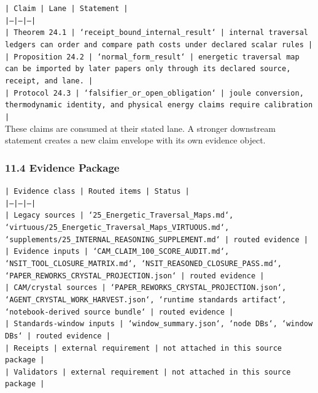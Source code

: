 \documentclass[11pt]{article}
\begin{document}
\noindent\texttt{| Claim | Lane | Statement |}\\
\noindent\texttt{|---|---|---|}\\
\noindent\texttt{| Theorem 24.1 | `receipt\_bound\_internal\_result` | internal traversal ledgers can order and compare path costs under declared scalar rules |}\\
\noindent\texttt{| Proposition 24.2 | `normal\_form\_result` | energetic traversal map can be imported by later papers only through its declared source, receipt, and lane. |}\\
\noindent\texttt{| Protocol 24.3 | `falsifier\_or\_open\_obligation` | joule conversion, thermodynamic identity, and physical energy claims require calibration |}\\

These claims are consumed at their stated lane. A stronger downstream statement
creates a new claim envelope with its own evidence object.

\subsubsection*{11.4 Evidence Package}

\noindent\texttt{| Evidence class | Routed items | Status |}\\
\noindent\texttt{|---|---|---|}\\
\noindent\texttt{| Legacy sources | `25\_Energetic\_Traversal\_Maps.md`, `virtuous/25\_Energetic\_Traversal\_Maps\_VIRTUOUS.md`, `supplements/25\_INTERNAL\_REASONING\_SUPPLEMENT.md` | routed evidence |}\\
\noindent\texttt{| Evidence inputs | `CAM\_CLAIM\_100\_SCORE\_AUDIT.md`, `NSIT\_TOOL\_CLOSURE\_MATRIX.md`, `NSIT\_REASONED\_CLOSURE\_PASS.md`, `PAPER\_REWORKS\_CRYSTAL\_PROJECTION.json` | routed evidence |}\\
\noindent\texttt{| CAM/crystal sources | `PAPER\_REWORKS\_CRYSTAL\_PROJECTION.json`, `AGENT\_CRYSTAL\_WORK\_HARVEST.json`, `runtime standards artifact`, `notebook-derived source bundle` | routed evidence |}\\
\noindent\texttt{| Standards-window inputs | `window\_summary.json`, `node DBs`, `window DBs` | routed evidence |}\\
\noindent\texttt{| Receipts | external requirement | not attached in this source package |}\\
\noindent\texttt{| Validators | external requirement | not attached in this source package |}\\
\end{document}
